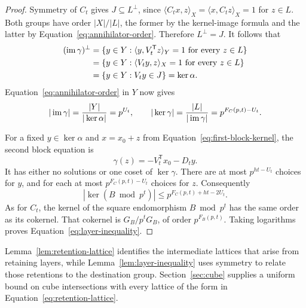 \begin{proof}
Symmetry of \(C_t\) gives \(J\subseteq L^\perp\), since
\(\langle C_tx,z\rangle_X=\langle x,C_tz\rangle_X=1\) for
\(z\in L\). Both groups have order \(|X|/|L|\), the former by the
kernel-image formula and the latter by
Equation~\eqref{eq:annihilator-order}. Therefore \(L^\perp=J\).
It follows that
\begin{align*}
 (\operatorname{im}\gamma)^\perp
  &=\{y\in Y:\langle y,V_t^{\mathsf T}z\rangle_Y=1
                    \text{ for every }z\in L\}\\
  &=\{y\in Y:\langle V_ty,z\rangle_X=1
                    \text{ for every }z\in L\}\\
  &=\{y\in Y:V_ty\in J\}=\ker\alpha.
\end{align*}
Equation~\eqref{eq:annihilator-order} in \(Y\) now gives
\[
 |\operatorname{im}\gamma|=\frac{|Y|}{|\ker\alpha|}=p^{U_t},
 \qquad
 |\ker\gamma|=\frac{|L|}{|\operatorname{im}\gamma|}
              =p^{F_C(p,t)-U_t}.
\]

For a fixed \(y\in\ker\alpha\) and \(x=x_0+z\) from
Equation~\eqref{eq:first-block-kernel}, the second block equation is
\[
 \gamma(z)=-V_t^{\mathsf T}x_0-D_ty.
\]
It has either no solutions or one coset of \(\ker\gamma\).
There are at most \(p^{ht-U_t}\) choices for \(y\), and for each at
most \(p^{F_C(p,t)-U_t}\) choices for \(z\). Consequently
\[
 |\ker(B\bmod p^t)|\le p^{F_C(p,t)+ht-2U_t}.
\]
As for \(C_t\), the kernel of the square endomorphism \(B\bmod p^t\)
has the same order as its cokernel. That cokernel is
\(G_B/p^tG_B\), of order \(p^{F_B(p,t)}\). Taking logarithms proves
Equation~\eqref{eq:layer-inequality}.
\end{proof}

Lemma~\ref{lem:retention-lattice} identifies the intermediate lattices
that arise from retaining layers, while Lemma~\ref{lem:layer-inequality}
uses symmetry to relate those retentions to the destination group.
Section~\ref{sec:cube} supplies a uniform bound on cube
intersections with every lattice of the form in
Equation~\eqref{eq:retention-lattice}.
